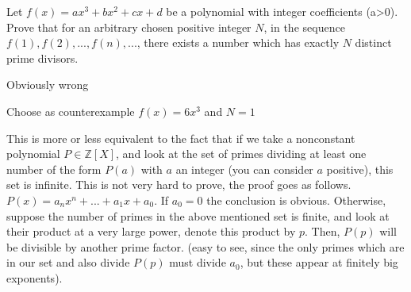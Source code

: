 \begin{solution}
	\begin{tcolorbox}Let $f(x)=ax^3+bx^2+cx+d$ be a polynomial with integer coefficients (a>0). Prove that for an arbitrary chosen positive integer $N$, in the sequence $f(1), f(2),..., f(n), ...$, there exists a number which has exactly $N$ distinct prime divisors.\end{tcolorbox}
Obviously wrong

Choose as counterexample $f(x)=6x^3$ and $N=1$
\end{solution}






\begin{solution}
	This is more or less equivalent to the fact that if we take a nonconstant polynomial $P \in \mathbb{Z}[X]$, and look at the set of primes dividing at least one number of the form $P(a)$ with $a$ an integer (you can consider $a$ positive), this set is infinite. This is not very hard to prove, the proof goes as follows. $P(x)=a_nx^n+...+a_1x+a_0$. If $a_0=0$ the conclusion is obvious. Otherwise, suppose the number of primes in the above mentioned set is finite, and look at their product at a very large power, denote this product by $p$. Then, $P(p)$ will be divisible by another prime factor. (easy to see, since the only primes which are in our set and also divide $P(p)$ must divide $a_0$, but these appear at finitely big exponents).
\end{solution}



